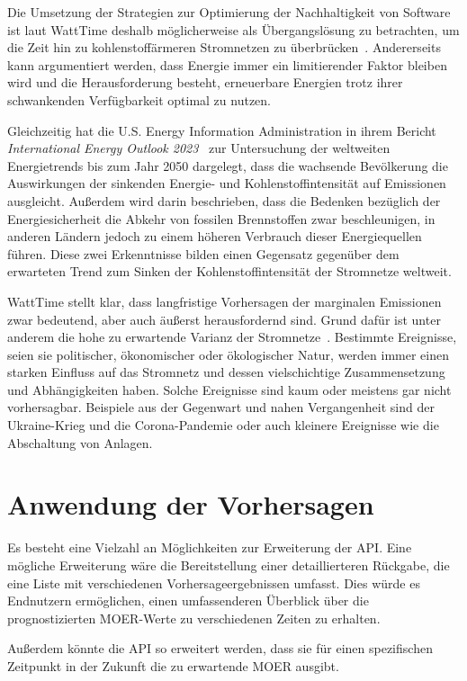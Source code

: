 Die Umsetzung der Strategien zur Optimierung der Nachhaltigkeit von Software ist laut WattTime deshalb möglicherweise als Übergangslösung zu betrachten, um die Zeit hin zu kohlenstoffärmeren Stromnetzen zu überbrücken~\cite{WattTime.12.3.2024}.
Andererseits kann argumentiert werden, dass Energie immer ein limitierender Faktor bleiben wird und die Herausforderung besteht, erneuerbare Energien trotz ihrer schwankenden Verfügbarkeit optimal zu nutzen.

Gleichzeitig hat die U.S. Energy Information Administration in ihrem Bericht \textit{International Energy Outlook 2023}~\cite{U.S.EnergyInformationAdministration.2023} zur Untersuchung der weltweiten Energietrends bis zum Jahr 2050 dargelegt, dass die wachsende Bevölkerung die Auswirkungen der sinkenden Energie- und Kohlenstoffintensität auf Emissionen ausgleicht.
Außerdem wird darin beschrieben, dass die Bedenken bezüglich der Energiesicherheit die Abkehr von fossilen Brennstoffen zwar beschleunigen, in anderen Ländern jedoch zu einem höheren Verbrauch dieser Energiequellen führen.
Diese zwei Erkenntnisse bilden einen Gegensatz gegenüber dem erwarteten Trend zum Sinken der Kohlenstoffintensität der Stromnetze weltweit.


WattTime stellt klar, dass langfristige Vorhersagen der marginalen Emissionen zwar bedeutend, aber auch äußerst herausfordernd sind.
Grund dafür ist unter anderem die hohe zu erwartende Varianz der Stromnetze~\cite{WattTime.2022}.
Bestimmte Ereignisse, seien sie politischer, ökonomischer oder ökologischer Natur, werden immer einen starken Einfluss auf das Stromnetz und dessen vielschichtige Zusammensetzung und Abhängigkeiten haben.
Solche Ereignisse sind kaum oder meistens gar nicht vorhersagbar.
Beispiele aus der Gegenwart und nahen Vergangenheit sind der Ukraine-Krieg und die Corona-Pandemie oder auch kleinere Ereignisse wie die Abschaltung von Anlagen.

\section{Anwendung der Vorhersagen}
Es besteht eine Vielzahl an Möglichkeiten zur Erweiterung der \ac{API}.
Eine mögliche Erweiterung wäre die Bereitstellung einer detaillierteren Rückgabe, die eine Liste mit verschiedenen Vorhersageergebnissen umfasst.
Dies würde es Endnutzern ermöglichen, einen umfassenderen Überblick über die prognostizierten \ac{MOER}-Werte zu verschiedenen Zeiten zu erhalten.

Außerdem könnte die \ac{API} so erweitert werden, dass sie für einen spezifischen Zeitpunkt in der Zukunft die zu erwartende \ac{MOER} ausgibt.

